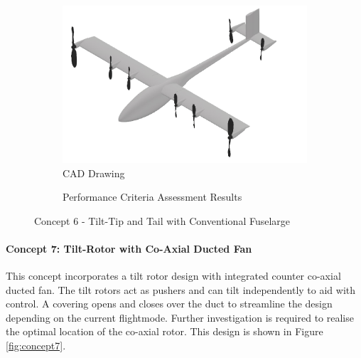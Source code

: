 \begin{figure}[H]
\centering
\begin{subfigure}[t]{.5\textwidth}
  \centering
  \includegraphics[width=0.95\linewidth]{Concepts/CAD/round2_1_cad.png}
  \vspace{0.125cm}
  \caption{CAD Drawing}
  \label{fig:cad6}
\end{subfigure}%
\begin{subfigure}[t]{.5\textwidth}
  \centering
  \caption{Performance Criteria Assessment Results}
  \label{fig:radar6}
\end{subfigure}
\caption{Concept 6 - Tilt-Tip and Tail with Conventional Fuselarge}
\label{fig:concept6}
\end{figure}

\paragraph{Concept 7: Tilt-Rotor with Co-Axial Ducted Fan}
This concept incorporates a tilt rotor design with integrated counter co-axial ducted fan. The tilt rotors act as pushers and can tilt independently to aid with control. A covering opens and closes over the duct to streamline the design depending on the current flightmode. Further investigation is required to realise the optimal location of the co-axial rotor. This design is shown in Figure \ref{fig:concept7}.

